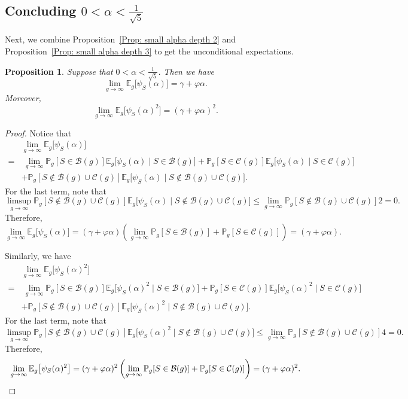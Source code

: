 \documentclass[12pt]{amsart}
\def\B{{\mathcal B}}
\def\E{{\mathbb E}}
\renewcommand{\phi}{\varphi}
\renewcommand{\P}{\mathbb{P}}
\newcommand{\cC}{\mathcal{C}}
\newtheorem{proposition}[theorem]{Proposition}
\begin{document}
\subsection{Concluding $0<\alpha<\frac{1}{\sqrt{5}}$}

Next, we combine Proposition~\ref{Prop: small alpha depth 2} and Proposition~\ref{Prop: small alpha depth 3} to get the unconditional expectations.


\begin{proposition}\label{Prop: small alpha}
Suppose that $0<\alpha<\frac{1}{\sqrt{5}}$.
Then we have
\[\lim_{g\to\infty} \E_g \big[\psi_S(\alpha)\big] = \gamma+\phi\alpha. \]
Moreover,
\[
\lim_{g\to\infty} \E_g \big[\psi_S(\alpha)^2\big] = (\gamma+\phi\alpha)^2. 
\]
\end{proposition}
\begin{proof}
Notice that
\begin{align*}
& \lim_{g\to\infty} \E_g \big[\psi_S(\alpha)\big]\\ 
= &\ \lim_{g\to\infty} \P_g[S\in \B(g)] \E_g \big[\psi_S(\alpha) \mid S\in \B(g)\big]
+\P_g[S\in \cC(g)] \E_g \big[\psi_S(\alpha) \mid S\in \cC(g)\big]\\
& +\P_g[S\notin \B(g)\cup\cC(g)] \E_g \big[\psi_S(\alpha) \mid S\notin \B(g)\cup\cC(g)\big].
\end{align*}
For the last term, note that
\[
\limsup_{g\to\infty}\P_g[S\notin \B(g)\cup\cC(g)] \E_g \big[\psi_S(\alpha) \mid S\notin \B(g)\cup\cC(g)\big]
\leq \lim_{g\to\infty}\P_g[S\notin \B(g)\cup\cC(g)] 2 =0.
\]
Therefore,
\[
\lim_{g\to\infty} \E_g \big[\psi_S(\alpha)\big]
= (\gamma+\phi\alpha ) \left(\lim_{g\to\infty} \P_g[S\in \B(g)] 
+\P_g[S\in \cC(g)] \right)
=(\gamma+\phi\alpha ).
\]

Similarly, we have
\begin{align*}
&\lim_{g\to\infty} \E_g \big[\psi_S(\alpha)^2\big]\\ 
=&\ \lim_{g\to\infty} \P_g[S\in \B(g)] \E_g \big[\psi_S(\alpha)^2 \mid S\in \B(g)\big]
+\P_g[S\in \cC(g)] \E_g \big[\psi_S(\alpha)^2 \mid S\in \cC(g)\big]\\
&+\P_g[S\notin \B(g)\cup\cC(g)] \E_g \big[\psi_S(\alpha)^2 \mid S\notin \B(g)\cup\cC(g)\big].
\end{align*}
For the last term, note that
\[\limsup_{g\to\infty}\P_g[S\notin \B(g)\cup\cC(g)] \E_g \big[\psi_S(\alpha)^2 \mid S\notin \B(g)\cup\cC(g)\big]
\leq \lim_{g\to\infty}\P_g[S\notin \B(g)\cup\cC(g)] 4 =0.\]
Therefore,
\[
\lim_{g\to\infty} \E_g \big[\psi_S(\alpha)^2\big]
= (\gamma+\phi\alpha )^2 \left(\lim_{g\to\infty} \P_g[S\in \B(g)] 
+\P_g[S\in \cC(g)] \right)
=(\gamma+\phi\alpha )^2.\qedhere
\]
\end{proof}
\end{document}
